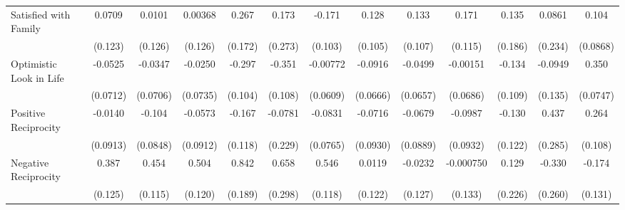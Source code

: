 {\begin{tabular}{l*{12}{c}}
\addlinespace
Satisfied with Family&      0.0709         &      0.0101         &     0.00368         &       0.267         &       0.173         &      -0.171         &       0.128         &       0.133         &       0.171         &       0.135         &      0.0861         &       0.104         \\
            &     (0.123)         &     (0.126)         &     (0.126)         &     (0.172)         &     (0.273)         &     (0.103)         &     (0.105)         &     (0.107)         &     (0.115)         &     (0.186)         &     (0.234)         &    (0.0868)         \\
\addlinespace
Optimistic Look in Life&     -0.0525         &     -0.0347         &     -0.0250         &      -0.297\sym{**} &      -0.351\sym{**} &    -0.00772         &     -0.0916         &     -0.0499         &    -0.00151         &      -0.134         &     -0.0949         &       0.350\sym{***}\\
            &    (0.0712)         &    (0.0706)         &    (0.0735)         &     (0.104)         &     (0.108)         &    (0.0609)         &    (0.0666)         &    (0.0657)         &    (0.0686)         &     (0.109)         &     (0.135)         &    (0.0747)         \\
\addlinespace
Positive Reciprocity&     -0.0140         &      -0.104         &     -0.0573         &      -0.167         &     -0.0781         &     -0.0831         &     -0.0716         &     -0.0679         &     -0.0987         &      -0.130         &       0.437         &       0.264\sym{*}  \\
            &    (0.0913)         &    (0.0848)         &    (0.0912)         &     (0.118)         &     (0.229)         &    (0.0765)         &    (0.0930)         &    (0.0889)         &    (0.0932)         &     (0.122)         &     (0.285)         &     (0.108)         \\
\addlinespace
Negative Reciprocity&       0.387\sym{**} &       0.454\sym{***}&       0.504\sym{***}&       0.842\sym{***}&       0.658\sym{*}  &       0.546\sym{***}&      0.0119         &     -0.0232         &   -0.000750         &       0.129         &      -0.330         &      -0.174         \\
            &     (0.125)         &     (0.115)         &     (0.120)         &     (0.189)         &     (0.298)         &     (0.118)         &     (0.122)         &     (0.127)         &     (0.133)         &     (0.226)         &     (0.260)         &     (0.131)         \\
\bottomrule
\end{tabular}
}
